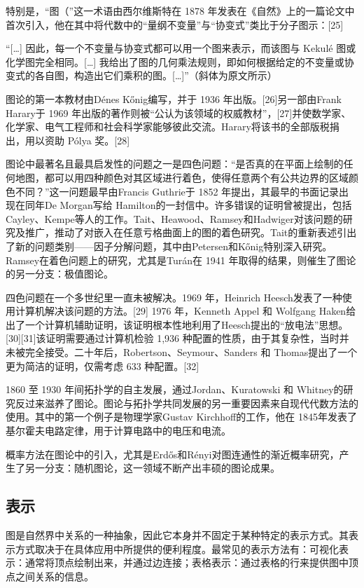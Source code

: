 特别是，“图（”这一术语由西尔维斯特在 1878 年发表在《自然》上的一篇论文中首次引入，他在其中将代数中的“量纲不变量”与“协变式”类比于分子图示：[25]

“[…] 因此，每一个不变量与协变式都可以用一个图来表示，而该图与 Kekulé 图或化学图完全相同。[…] 我给出了图的几何乘法规则，即如何根据给定的不变量或协变式的各自图，构造出它们乘积的图。[…]”（斜体为原文所示）

图论的第一本教材由Dénes Kőnig编写，并于 1936 年出版。[26]另一部由Frank Harary于 1969 年出版的著作则被“公认为该领域的权威教材”，[27]并使数学家、化学家、电气工程师和社会科学家能够彼此交流。Harary将该书的全部版税捐出，用以资助 Pólya 奖。[28]

图论中最著名且最具启发性的问题之一是四色问题：“是否真的在平面上绘制的任何地图，都可以用四种颜色对其区域进行着色，使得任意两个有公共边界的区域颜色不同？”这一问题最早由Francis Guthrie于 1852 年提出，其最早的书面记录出现在同年De Morgan写给 Hamilton的一封信中。许多错误的证明曾被提出，包括Cayley、Kempe等人的工作。Tait、Heawood、Ramsey和Hadwiger对该问题的研究及推广，推动了对嵌入在任意亏格曲面上的图的着色研究。Tait的重新表述引出了新的问题类别——因子分解问题，其中由Petersen和Kőnig特别深入研究。Ramsey在着色问题上的研究，尤其是Turán在 1941 年取得的结果，则催生了图论的另一分支：极值图论。

四色问题在一个多世纪里一直未被解决。1969 年，Heinrich Heesch发表了一种使用计算机解决该问题的方法。[29] 1976 年，Kenneth Appel 和 Wolfgang Haken给出了一个计算机辅助证明，该证明根本性地利用了Heesch提出的“放电法”思想。[30][31]该证明需要通过计算机检验 1,936 种配置的性质，由于其复杂性，当时并未被完全接受。二十年后，Robertson、Seymour、Sanders 和 Thomas提出了一个更为简洁的证明，仅需考虑 633 种配置。[32]

1860 至 1930 年间拓扑学的自主发展，通过Jordan、Kuratowski 和 Whitney的研究反过来滋养了图论。图论与拓扑学共同发展的另一重要因素来自现代代数方法的使用。其中的第一个例子是物理学家Gustav Kirchhoff的工作，他在 1845年发表了基尔霍夫电路定律，用于计算电路中的电压和电流。

概率方法在图论中的引入，尤其是Erdős和Rényi对图连通性的渐近概率研究，产生了另一分支：随机图论，这一领域不断产出丰硕的图论成果。
\subsection{表示}
图是自然界中关系的一种抽象，因此它本身并不固定于某种特定的表示方式。其表示方式取决于在具体应用中所提供的便利程度。最常见的表示方法有：可视化表示：通常将顶点绘制出来，并通过边连接；表格表示：通过表格的行来提供图中顶点之间关系的信息。
